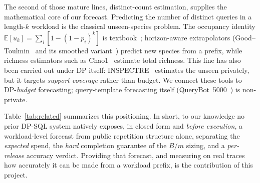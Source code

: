 \documentclass[sigconf,nonacm]{acmart}
\newcommand{\E}{\mathbb{E}}
\begin{document}
The second of those mature lines, distinct-count estimation, supplies the mathematical core of our forecast. Predicting the number of distinct queries in a length-$k$ workload is the classical unseen-species problem. The occupancy identity $\E[u_k]=\sum_i[1-(1-p_i)^k]$ is textbook~\cite{flajolet1992}; horizon-aware extrapolators (Good--Toulmin~\cite{goodtoulmin1956} and its smoothed variant~\cite{orlitsky2016unseen}) predict new species from a prefix, while richness estimators such as Chao1~\cite{chao1984} estimate total richness. This line has also been carried out under DP itself: INSPECTRE~\cite{acharya2018inspectre} estimates the unseen privately, but it targets \emph{support coverage} rather than budget. We connect these tools to DP-\emph{budget} forecasting; query-template forecasting itself (QueryBot~5000~\cite{ma2018qb5000}) is non-private.

\begin{table}[t]
\footnotesize\centering
\caption{Positioning. To our knowledge, no prior system natively exposes a closed-form, before-execution budget forecast from public workload structure alone.}
\label{tab:related}
\setlength{\tabcolsep}{4pt}
\end{table}

Table~\ref{tab:related} summarizes this positioning. In short, to our knowledge no prior DP-SQL system natively exposes, in closed form and \emph{before execution}, a workload-level forecast from public repetition structure alone, separating the \emph{expected} spend, the \emph{hard} completion guarantee of the $B/m$ sizing, and a \emph{per-release} accuracy verdict. Providing that forecast, and measuring on real traces how accurately it can be made from a workload prefix, is the contribution of this project.
\end{document}
